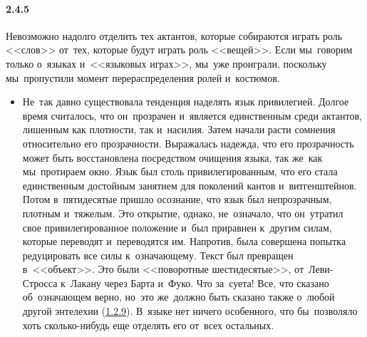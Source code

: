 \paragraph{2.4.5}\hypertarget{par:2.4.5}{} Невозможно надолго отделить тех актантов, которые собираются играть роль <<слов>> от~тех, которые будут играть роль <<вещей>>. Если мы~говорим только о~языках и~<<языковых играх>>, мы~уже проиграли, поскольку мы~пропустили момент перераспределения ролей и~костюмов. 
	\begin{itemize}
	\item 
 Не~так давно существовала тенденция наделять язык привилегией. Долгое время считалось, что он~прозрачен и~является единственным среди актантов, лишенным как плотности, так и~насилия. Затем начали расти сомнения относительно его прозрачности. Выражалась надежда, что его прозрачность может быть восстановлена посредством очищения языка, так же~как мы~протираем окно. Язык был столь привилегированным, что его стала единственным достойным занятием для поколений кантов и~витгенштейнов. Потом в~пятидесятые пришло осознание, что язык был непрозрачным, плотным и~тяжелым. Это открытие, однако, не~означало, что он~утратил свое привилегированное положение и~был приравнен к~другим силам, которые переводят и~переводятся им. Напротив, была совершена попытка редуцировать все силы к~означающему. Текст был превращен в~<<объект>>. Это были <<поворотные шестидесятые>>, от~Леви-Стросса к~Лакану через Барта и~Фуко. Что за~суета! Все, что сказано об~означающем верно, но~это же~должно быть сказано также о~любой другой энтелехии (\hyperlink{par:1.2.9}{1.2.9}). В~языке нет ничего особенного, что бы~позволяло хоть сколько-нибудь еще отделять его от~всех остальных. 
	\end{itemize}

